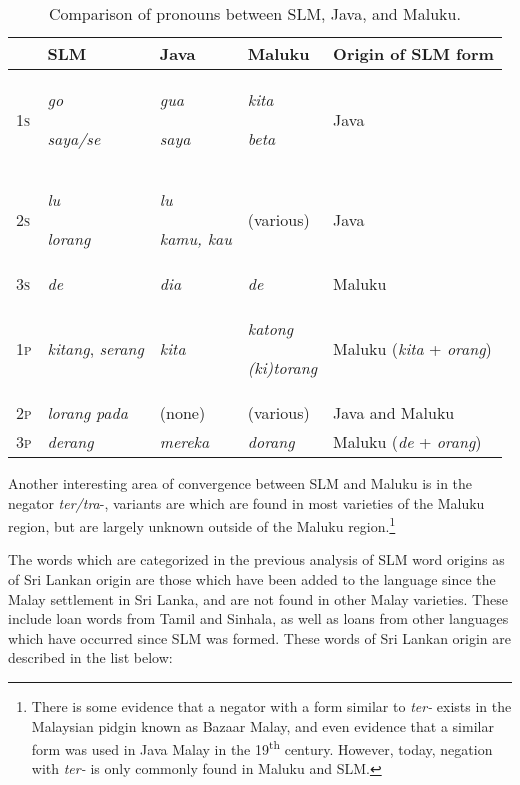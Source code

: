 \begin{table}

\begin{tabular}{lllll}
 &
\textbf{SLM} &
\textbf{Java} &
\textbf{Maluku} &
\textbf{Origin of SLM form}\\\hline
1\textsc{s} &
\textit{go}

\textit{saya/se} &
\textit{gua}

\textit{saya} &
\textit{kita}

\textit{beta} &
Java\\
2\textsc{s} &
\textit{lu}

\textit{lorang} &
\textit{lu}

\textit{kamu, kau} &
(various) &
Java\\
3\textsc{s} &
\textit{de} &
\textit{dia} &
\textit{de} &
Maluku\\
1\textsc{p} &
\textit{kitang}, \textit{serang} &
\textit{kita } &
\textit{katong}

\textit{(ki)torang} &
Maluku (\textit{kita} + \textit{orang})\\
2\textsc{p} &
\textit{lorang pada} &
(none) &
(various) &
Java and Maluku\\
3\textsc{p} &
\textit{derang} &
\textit{mereka} &
\textit{dorang} &
Maluku (\textit{de} + \textit{orang})\\
\end{tabular}
\caption{Comparison of pronouns  between SLM, Java, and Maluku.}
\label{paauw:tab:pronounsslmjavamaluku}
\end{table}

Another interesting area of convergence between SLM and Maluku is in the negator \textit{ter/tra}{}-, variants are which are found in most varieties of the Maluku region, but are largely unknown outside of the Maluku region.\footnote{There
 is some evidence that a negator with a form similar to \textit{ter-} exists in the Malaysian pidgin known as Bazaar Malay, and even evidence that a similar form was used in Java Malay in the 19\textsuperscript{th} century. However, today, negation with \textit{ter-} is only commonly found in Maluku and SLM. 
} 

The words which are categorized in the previous analysis of SLM word origins as of Sri Lankan origin are those which have been added to the language since the Malay settlement in Sri Lanka, and are not found in other Malay varieties. These include loan words from Tamil and Sinhala, as well as loans from other languages which have occurred since SLM was formed. These words of Sri Lankan origin are described in the list below:

